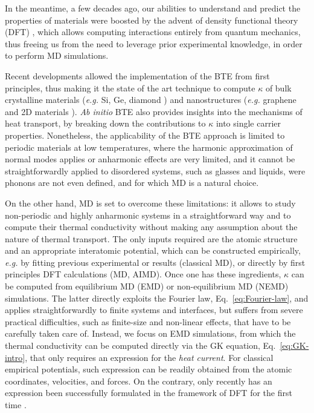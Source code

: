 In the meantime, a few decades ago, our abilities to understand and predict the properties of materials were boosted by the advent of density functional theory (DFT) \LE{[*ref*]}, which allows computing interactions entirely from quantum mechanics, thus freeing us from the need to leverage prior experimental knowledge, in order to perform MD simulations. 

Recent developments allowed the implementation of the BTE from first principles, thus making it the state of the art technique to compute $\kappa$ of bulk crystalline materials (\emph{e.g.} Si, Ge, diamond \cite{Broido:2007iu,Ward2009}) and nanostructures (\emph{e.g.} graphene and 2D materials \cite{Fugallo2014}). \emph{Ab initio} BTE also provides insights into the mechanisms of heat transport, by breaking down the contributions to $\kappa$ into single carrier properties. 
Nonetheless, the applicability of the BTE approach is limited to periodic materials at low temperatures, where the harmonic approximation of normal modes applies or anharmonic effects are very limited, and it cannot be straightforwardly applied to disordered systems, such as glasses and liquids, were phonons are not even defined, and for which MD is a natural choice. 

On the other hand, MD is set to overcome these limitations: it allows to study non-periodic and highly anharmonic systems in a straightforward way and to compute their thermal conductivity without making any assumption about the nature of thermal transport. The only inputs required are the atomic structure and an appropriate interatomic potential, which can be constructed empirically, \emph{e.g.} by fitting previous experimental or \abinitio results (classical MD), or directly by first principles DFT calculations (\abinitio MD, AIMD). 
Once one has these ingredients, $\kappa$ can be computed from equilibrium MD (EMD) or non-equilibrium MD (NEMD) simulations. The latter directly exploits the Fourier law, Eq.~\eqref{eq:Fourier-law}, and applies straightforwardly to finite systems and interfaces, but suffers from severe practical difficulties, such as finite-size and non-linear effects, that have to be carefully taken care of. 
Instead, we focus on EMD simulations, from which the thermal conductivity can be computed directly via the GK equation, Eq.~\eqref{eq:GK-intro}, that only requires an expression for the \emph{heat current}. For classical empirical potentials, such expression can be readily obtained from the atomic coordinates, velocities, and forces. On the contrary, only recently has an expression been successfully formulated in the framework of DFT for the first time \cite{Marcolongo2016}. 

